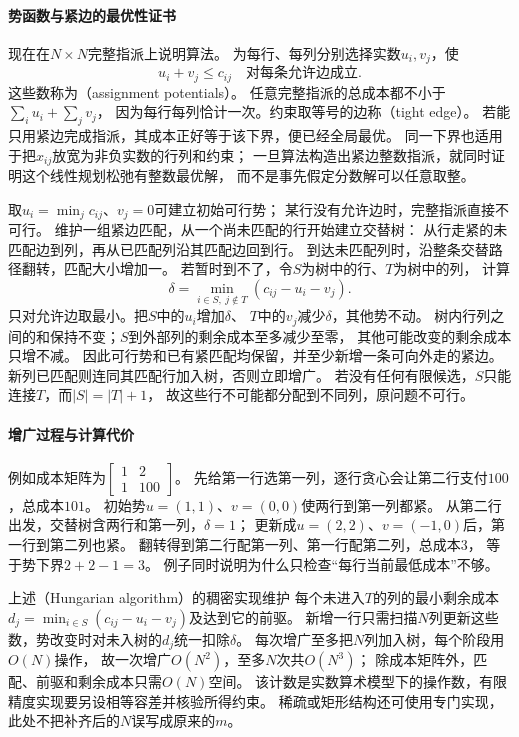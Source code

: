 \paragraph{势函数与紧边的最优性证书}
现在在$N\times N$完整指派上说明算法。
为每行、每列分别选择实数$u_i,v_j$，使
\begin{equation}
 u_i+v_j\leq c_{ij}
 \quad\text{对每条允许边成立}.
 \label{eq:graph-assignment-potentials}
\end{equation}
这些数称为（assignment potentials）。
任意完整指派的总成本都不小于$\sum_i u_i+\sum_jv_j$，
因为每行每列恰计一次。约束取等号的边称（tight edge）。
若能只用紧边完成指派，其成本正好等于该下界，便已经全局最优。
同一下界也适用于把$x_{ij}$放宽为非负实数的行列和约束；
一旦算法构造出紧边整数指派，就同时证明这个线性规划松弛有整数最优解，
而不是事先假定分数解可以任意取整。

取$u_i=\min_jc_{ij}$、$v_j=0$可建立初始可行势；
某行没有允许边时，完整指派直接不可行。
维护一组紧边匹配，从一个尚未匹配的行开始建立交替树：
从行走紧的未匹配边到列，再从已匹配列沿其匹配边回到行。
到达未匹配列时，沿整条交替路径翻转，匹配大小增加一。
若暂时到不了，令$S$为树中的行、$T$为树中的列，
计算
\[
 \delta=\min_{i\in S,\ j\notin T}(c_{ij}-u_i-v_j).
\]
只对允许边取最小。把$S$中的$u_i$增加$\delta$、
$T$中的$v_j$减少$\delta$，其他势不动。
树内行列之间的和保持不变；$S$到外部列的剩余成本至多减少至零，
其他可能改变的剩余成本只增不减。
因此可行势和已有紧匹配均保留，并至少新增一条可向外走的紧边。
新列已匹配则连同其匹配行加入树，否则立即增广。
若没有任何有限候选，$S$只能连接$T$，而$|S|=|T|+1$，
故这些行不可能都分配到不同列，原问题不可行。

\paragraph{增广过程与计算代价}
例如成本矩阵为$\begin{bmatrix}1&2\\1&100\end{bmatrix}$。
先给第一行选第一列，逐行贪心会让第二行支付$100$，总成本$101$。
初始势$u=(1,1)$、$v=(0,0)$使两行到第一列都紧。
从第二行出发，交替树含两行和第一列，$\delta=1$；
更新成$u=(2,2)$、$v=(-1,0)$后，第一行到第二列也紧。
翻转得到第二行配第一列、第一行配第二列，总成本$3$，
等于势下界$2+2-1=3$。
例子同时说明为什么只检查“每行当前最低成本”不够。

上述（Hungarian algorithm）的稠密实现维护
每个未进入$T$的列的最小剩余成本
$d_j=\min_{i\in S}(c_{ij}-u_i-v_j)$及达到它的前驱。
新增一行只需扫描$N$列更新这些数，势改变时对未入树的$d_j$统一扣除$\delta$。
每次增广至多把$N$列加入树，每个阶段用$O(N)$操作，
故一次增广$O(N^2)$，至多$N$次共$O(N^3)$；
除成本矩阵外，匹配、前驱和剩余成本只需$O(N)$空间。
该计数是实数算术模型下的操作数，有限精度实现要另设相等容差并核验所得约束。
稀疏或矩形结构还可使用专门实现，此处不把补齐后的$N$误写成原来的$m$。

